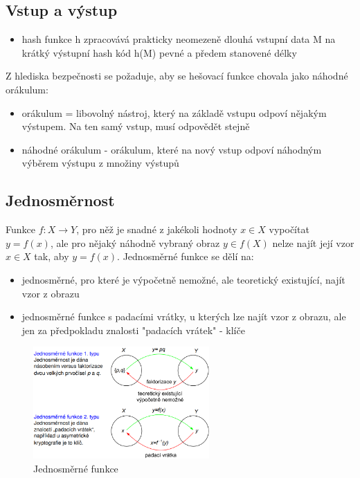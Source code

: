\documentclass{szzclass}
\begin{document}
\subsection{Vstup a výstup}
\begin{itemize}
    \item hash funkce h zpracovává prakticky neomezeně dlouhá vstupní data M na krátký výstupní hash kód h(M) pevné a předem stanovené délky
\end{itemize}
Z hlediska bezpečnosti se požaduje, aby se hešovací funkce chovala jako náhodné orákulum:
\begin{itemize}
    \item orákulum = libovolný nástroj, který na základě vstupu odpoví nějakým výstupem. Na ten samý vstup, musí odpovědět stejně
    \item náhodné orákulum - orákulum, které na nový vstup odpoví náhodným výběrem výstupu z množiny výstupů
\end{itemize}
\subsection{Jednosměrnost}
Funkce $f: X \rightarrow Y$, pro něž je snadné z jakékoli hodnoty $x \in X$ vypočítat $y = f(x)$, ale pro nějaký náhodně vybraný obraz $y \in f(X)$ nelze
najít její vzor $x \in X$ tak, aby $y = f(x).$
\newline
Jednosměrné funkce se dělí na:
\begin{itemize}
    \item jednosměrné, pro které je výpočetně nemožné, ale teoretický existující, najít vzor z obrazu
    \item jednosměrné funkce s padacími vrátky, u kterých lze najít vzor z obrazu, ale jen za předpokladu znalosti "padacích vrátek" - klíče
\end{itemize}
\begin{figure}[h!]
    \centering
    \includegraphics[width=0.6\textwidth]{topics/bi-spol-06/image/oneWayHashFunction.png}
    \caption{Jednosměrné funkce}
\end{figure}
\end{document}

